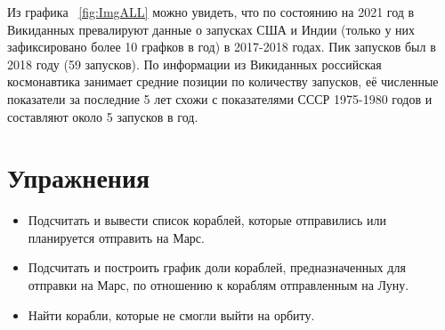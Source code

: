 Из графика ~\ref{fig:ImgALL} можно увидеть, что по состоянию на 2021 год в Викиданных превалируют данные о запусках США и Индии (только у них зафиксировано более 10 графков в год) в 2017-2018 годах. Пик запусков был в 2018 году (59 запусков). По информации из Викиданных российская космонавтика занимает средние позиции по количеству запусков, её численные показатели за последние 5 лет схожи с показателями СССР 1975-1980 годов и составляют около 5 запусков в год.

\section{Упражнения}
\begin{itemize}
  \item Подсчитать и вывести список кораблей, которые отправились или планируется отправить на Марс.
  \item Подсчитать и построить график доли кораблей, предназначенных для отправки на Марс, по отношению к кораблям отправленным на Луну.
  \item Найти корабли, которые не смогли выйти на орбиту.
\end{itemize}
